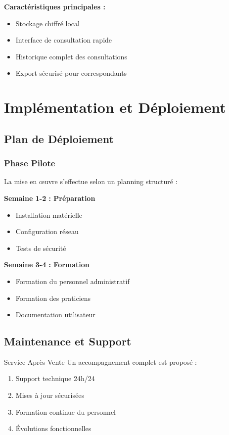 \documentclass{modern-report}
\begin{document}
\textbf{Caractéristiques principales :}
\begin{itemize}
    \item Stockage chiffré local
    \item Interface de consultation rapide
    \item Historique complet des consultations
    \item Export sécurisé pour correspondants
\end{itemize}

\chapter{Implémentation et Déploiement}

\section{Plan de Déploiement}

\subsection{Phase Pilote}

La mise en œuvre s'effectue selon un planning structuré :

\modernseparator

\textbf{Semaine 1-2 : Préparation}
\begin{itemize}
    \item Installation matérielle
    \item Configuration réseau
    \item Tests de sécurité
\end{itemize}

\textbf{Semaine 3-4 : Formation}
\begin{itemize}
    \item Formation du personnel administratif
    \item Formation des praticiens
    \item Documentation utilisateur
\end{itemize}

\section{Maintenance et Support}

\begin{modernbox}{Service Après-Vente}
Un accompagnement complet est proposé :
\begin{enumerate}
    \item Support technique 24h/24
    \item Mises à jour sécurisées
    \item Formation continue du personnel
    \item Évolutions fonctionnelles
\end{enumerate}
\end{modernbox}
\end{document}
